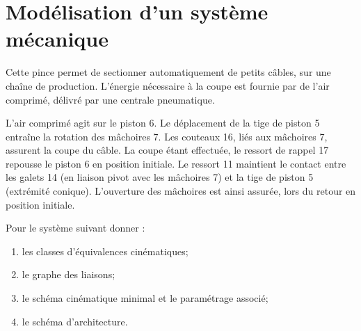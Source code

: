 \documentclass[11pt,oneside]{article}
\begin{document}
\section{Modélisation d'un système mécanique}
Cette pince permet de sectionner automatiquement de petits câbles, sur une chaîne de production. L’énergie nécessaire à la coupe est fournie par de l’air comprimé, délivré par une centrale pneumatique.

L'air comprimé agit sur le piston 6. Le déplacement de la tige de piston 5 entraîne la rotation des mâchoires 7. Les couteaux 16, liés aux mâchoires 7, assurent la coupe du câble. La coupe étant effectuée, le ressort de rappel 17 repousse le piston 6 en position initiale. Le ressort 11 maintient le contact entre les galets 14 (en liaison pivot avec les mâchoires 7) et la tige de piston 5 (extrémité conique). L’ouverture des mâchoires est ainsi assurée, lors du retour en position initiale.

\vspace{.5cm}

\begin{minipage}[c]{.55\linewidth}
Pour le système suivant donner :
\begin{enumerate}
\item les classes d'équivalences cinématiques;
\item le graphe des liaisons;
\item le schéma cinématique minimal et le paramétrage associé;
\item le schéma d'architecture.
\end{enumerate}
\end{minipage}\hfill
\begin{minipage}[c]{.4\linewidth}
\end{minipage}\hfill

\vspace{.5cm}
\end{document}
